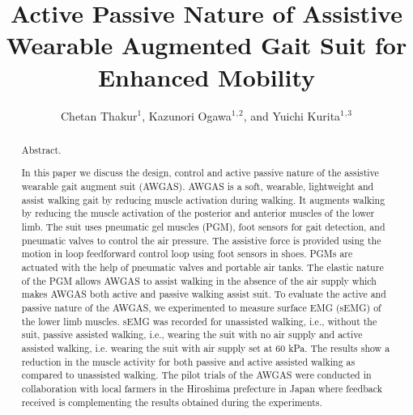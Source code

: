 \documentclass[paper,JRM,paper]{jaciiiarticle}
\begin{document}
\pagestyle{jaciiistyle}

\title{Active Passive Nature of Assistive Wearable Augmented Gait Suit for Enhanced Mobility}

\author{Chetan Thakur$^1$, Kazunori Ogawa$^1$$^,$$^2$, and Yuichi Kurita$^1$$^,$$^3$}
\address{$^1$Hiroshima University, Hiroshima, Japan\\
		 $^2$ Daiya Industries Co, Ltd. Okayama, Japan\\
		 $^3$ JST PRESTO, Saitama, Japan\\
         E-mail: chetanthakur@hiroshima-u.ac.jp}
\maketitle

\begin{abstract}%
\noindent Abstract. %

In this paper we discuss the design, control and active passive nature of the assistive wearable gait augment suit (AWGAS).  AWGAS is a soft, wearable, lightweight and assist walking gait by reducing muscle activation during walking. It augments walking by reducing the muscle activation of the posterior and anterior muscles of the lower limb. The suit uses pneumatic gel muscles (PGM), foot sensors for gait detection, and pneumatic valves to control the air pressure. The assistive force is provided using the motion in loop feedforward control loop using  foot sensors in shoes. PGMs are actuated with the help of pneumatic valves and portable air tanks. The elastic nature of the PGM allows AWGAS to assist walking in the absence of the air supply which makes AWGAS both active and passive walking assist suit. To evaluate the active and passive nature of the AWGAS, we experimented to measure surface EMG (sEMG) of the lower limb muscles. sEMG was recorded for unassisted walking, i.e., without the suit, passive assisted walking, i.e., wearing the suit with no air supply and active assisted walking, i.e. wearing the suit with air supply set at 60 kPa.  The results show a reduction in the muscle activity for both passive and active assisted walking as compared to unassisted walking. The pilot trials of the AWGAS were conducted in collaboration with local farmers in the Hiroshima prefecture in Japan where feedback received is complementing the results obtained during the experiments.

\end{abstract}
\end{document}

